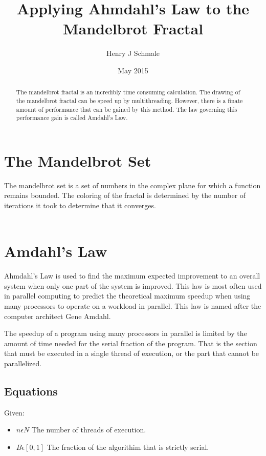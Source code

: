 \documentclass[10pt,oneside,letter]{article}
\begin{document}
\title{Applying Ahmdahl's Law to the Mandelbrot Fractal}
\author{Henry J Schmale}
\date{May 2015}
\maketitle

\begin{abstract}
The mandelbrot fractal is an incredibly time consuming calculation.
The drawing of the mandelbrot fractal can be speed up by multithreading.
However, there is a finate amount of performance that can be gained by
this method. The law governing this performance gain is called Amdahl's
Law.
\end{abstract}

\section{The Mandelbrot Set}
The mandelbrot set is a set of numbers in the complex plane for which
a function remains bounded. The coloring of the fractal is determined
by the number of iterations it took to determine that it converges.

\begin{equation}\label{eq:mandeldef}
    \begin{align}
    
    \end{align}
\end{equation}

\section{Amdahl's Law}
Ahmdahl's Law is used to find the maximum expected improvement to an overall
system when only one part of the system is improved. This law is most often
used in parallel computing to predict the theoretical maximum speedup when
using many processors to operate on a workload in parallel. This law is named
after the computer architect Gene Amdahl.

The speedup of a program using many processors in parallel is limited by the
amount of time needed for the serial fraction of the program. That is the
section that must be executed in a single thread of execution, or the part
that cannot be parallelized.

\subsection{Equations}
Given:
\begin{itemize}
  \item $n \epsilon N$ The number of threads of execution.
  \item $B \epsilon [0,1]$ The fraction of the algorithim that is strictly serial.
\end{itemize}
\end{document}
